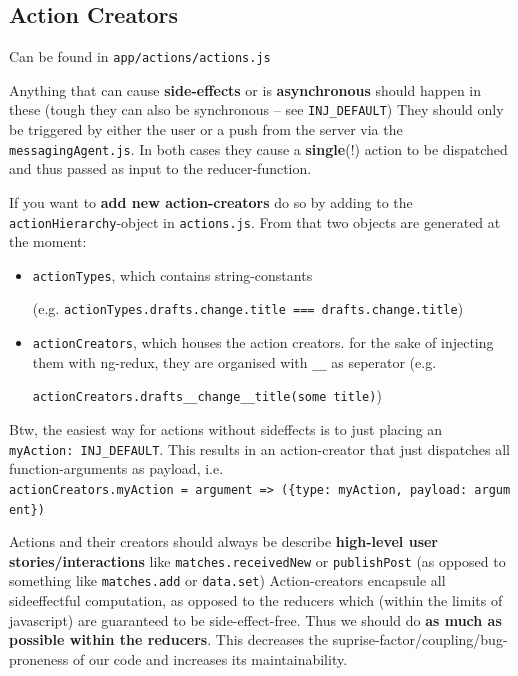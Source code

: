 \subsection{Action Creators}\label{sct:action-creators}

Can be found in \texttt{app/actions/actions.js} %

Anything that can cause \textbf{side-effects} or is
\textbf{asynchronous} should happen in these (tough they can also
be synchronous -- see \texttt{INJ\_DEFAULT}) %
They should only be triggered
by either the user or a push from the server via the
\texttt{messagingAgent.js}. In both cases they cause a
\textbf{single}(!) action to be dispatched and thus passed as
input to the reducer-function.

If you want to \textbf{add new action-creators} do so by adding to the
\texttt{actionHierarchy}-object in \texttt{actions.js}. %
From that two objects are generated at the moment:

\begin{itemize}
\tightlist
\item
  \texttt{actionTypes}, which contains string-constants

  (e.g.
  \texttt{actionTypes.drafts.change.title\ ===\
  \textquotesingle{}drafts.change.title\textquotesingle{}})
\item
  \texttt{actionCreators}, which houses the action creators. for the
  sake of injecting them with ng-redux, they are organised with
  \texttt{\_\_} as seperator (e.g.

  \texttt{actionCreators.drafts\_\_change\_\_title(\textquotesingle{}some\ title\textquotesingle{})})
\end{itemize}

Btw, the easiest way for actions without sideffects is to just placing
an \texttt{myAction:\ INJ\_DEFAULT}. This results in an action-creator
that just dispatches all function-arguments as payload, i.e.
\texttt{actionCreators.myAction\ =\ argument\ =\textgreater{}\ (\{type:\ \textquotesingle{}myAction\textquotesingle{},\ payload:\ argument\})}

Actions and their creators should always be describe \textbf{high-level user
stories/interactions} like \texttt{matches.receivedNew} or \texttt{publishPost}
(as opposed to something like \texttt{matches.add}
or \texttt{data.set})
Action-creators
encapsule all sideeffectful computation, as opposed to the reducers
which (within the limits of javascript) are guaranteed to be
side-effect-free. Thus we should do \textbf{as much as possible within
the reducers}. This decreases the suprise-factor/coupling/bug-proneness
of our code and increases its maintainability.

